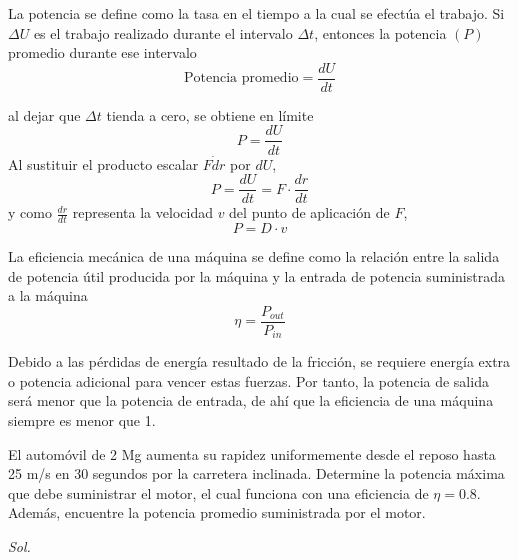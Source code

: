 \begin{definition}[Potencia]
    La potencia se define como la tasa en el tiempo a la cual se efectúa el trabajo. Si $\Delta U$ es el trabajo realizado durante el intervalo $\Delta t$, entonces la potencia $(P)$ promedio durante ese intervalo
    \begin{equation}
        \text{Potencia promedio}= \frac{dU}{dt}
    \end{equation}
\end{definition}
al dejar que $\Delta t$ tienda a cero, se obtiene en límite
\begin{equation*}
    P = \frac{dU}{dt}
\end{equation*}
Al sustituir el producto escalar $F\dot dr$ por $dU$,
\begin{equation*}
    P = \frac{dU}{dt} = F\cdot \frac{dr}{dt}
\end{equation*}
y como $\frac{dr}{dt}$ representa la velocidad $v$ del
punto de aplicación de $F$,
\begin{equation}
    P = D\cdot v
\end{equation}

\begin{definition}[Eficiencia]
    La eficiencia mecánica de una máquina se define como la relación entre la salida de potencia útil producida por la máquina y la entrada de potencia suministrada a la máquina
\begin{equation}
    \eta = \frac{P_{out}}{P_{in}}
\end{equation}
\end{definition}
Debido a las pérdidas de energía resultado de la fricción, se requiere energía extra o potencia adicional para vencer estas fuerzas. Por tanto, la potencia de salida será menor que la potencia de entrada, de ahí que la eficiencia de una máquina siempre es menor que 1.

\begin{example}
    El automóvil de 2 Mg aumenta su rapidez uniformemente desde el reposo hasta 25 m/s
    en 30 segundos por la carretera inclinada. Determine la potencia máxima que debe suministrar el
    motor, el cual funciona con una eficiencia de $\eta = 0.8$. Además, encuentre la potencia promedio
    suministrada por el motor.
\end{example}

\textit{ Sol. }

